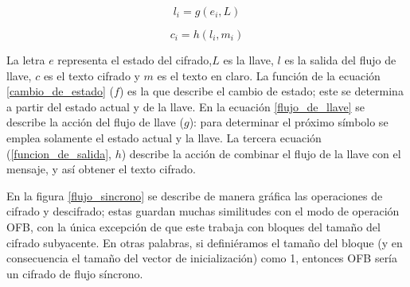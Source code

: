 \begin{equation}
  \label{flujo_de_llave}
  l_i = g(e_i, L)
\end{equation}

\begin{equation}
  \label{funcion_de_salida}
  c_i = h(l_i, m_i)
\end{equation}

\vspace{0.5cm}

La letra $ e $ representa el estado del cifrado,$ L $ es la llave, $ l $ es
la salida del flujo de llave, $ c $ es el texto cifrado y $ m $ es el texto en
claro. La función de la ecuación \ref{cambio_de_estado} ($ f $) es la que
describe el cambio de estado; este se determina a partir del estado actual y
de la llave. En la ecuación \ref{flujo_de_llave} se describe la acción del
flujo de llave ($ g $): para determinar el próximo símbolo se emplea solamente
el estado actual y la llave. La tercera ecuación (\ref{funcion_de_salida},
$ h $) describe la acción de combinar el flujo de la llave con el mensaje, y
así obtener el texto cifrado.


En la figura \ref{flujo_sincrono} se describe de manera gráfica las operaciones
de cifrado y descifrado; estas guardan muchas similitudes con el modo de
operación OFB, con la única excepción de que este trabaja con bloques del tamaño
del cifrado subyacente. En otras palabras, si definiéramos el tamaño del bloque
(y en consecuencia el tamaño del vector de inicialización) como 1, entonces
OFB sería un cifrado de flujo síncrono.

\vspace{0.5cm}

